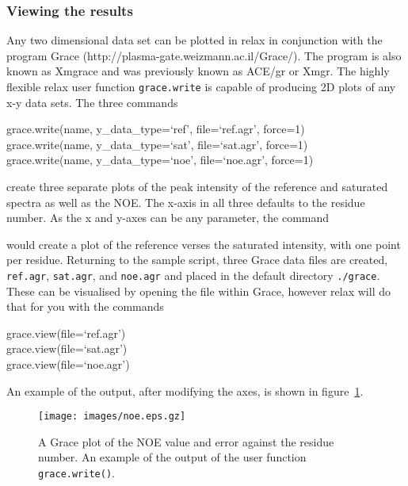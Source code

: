 \subsubsection{Viewing the results}

Any two dimensional data set can be plotted in relax in conjunction with the program Grace (http://plasma-gate.weizmann.ac.il/Grace/).  The program is also known as Xmgrace and was previously known as ACE/gr or Xmgr.  The highly flexible relax user function \texttt{grace.write} is capable of producing 2D plots of any x-y data sets.  The three commands

\begin{exampleenv}
grace.write(name, y\_data\_type=`ref', file=`ref.agr', force=1) \\
grace.write(name, y\_data\_type=`sat', file=`sat.agr', force=1) \\
grace.write(name, y\_data\_type=`noe', file=`noe.agr', force=1) \\
\end{exampleenv}

create three separate plots of the peak intensity of the reference and saturated spectra as well as the NOE.  The x-axis in all three defaults to the residue number.  As the x and y-axes can be any parameter, the command


would create a plot of the reference verses the saturated intensity, with one point per residue.  Returning to the sample script, three Grace data files are created, \texttt{ref.agr}, \texttt{sat.agr}, and \texttt{noe.agr} and placed in the default directory \texttt{./grace}.  These can be visualised by opening the file within Grace, however relax will do that for you with the commands

\begin{exampleenv}
grace.view(file=`ref.agr') \\
grace.view(file=`sat.agr') \\
grace.view(file=`noe.agr') \\
\end{exampleenv}

An example of the output, after modifying the axes, is shown in figure~\ref{fig: NOE plot}.

\begin{figure}
\centerline{\texttt{[image: images/noe.eps.gz]}}
\caption[NOE plot]{A Grace  plot of the NOE value and error against the residue number.  An example of the output of the user function \texttt{grace.write()}.}\label{fig: NOE plot}
\end{figure}



